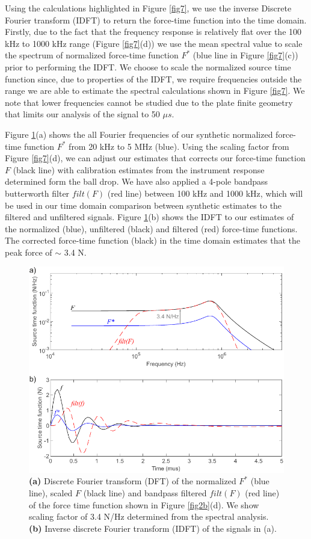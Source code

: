 \documentclass[preprint,3p, 11pt,authoryear]{elsarticle}
\begin{document}
Using the calculations highlighted in Figure \ref{fig7}, we use the inverse Discrete Fourier transform (IDFT) to return the force-time function into the time domain. Firstly, due to the fact that the frequency response is relatively flat over the 100 kHz to 1000 kHz range (Figure \ref{fig7}(d)) we use the mean spectral value to scale the spectrum of normalized force-time function $F^{*}$ (blue line in Figure \ref{fig7}(c)) prior to performing the IDFT. We choose to scale the normalized source time function since, due to properties of the IDFT, we require frequencies outside the range we are able to estimate the spectral calculations shown in Figure \ref{fig7}.  We note that lower frequencies cannot be studied due to the plate finite geometry that limits our analysis of the signal to 50 $\mu s$.  

Figure \ref{fig9}(a) shows the all Fourier frequencies of our synthetic normalized force-time function $F^{*}$ from 20 kHz to 5 MHz (blue). Using the scaling factor from Figure \ref{fig7}(d), we can adjust our estimates that corrects our force-time function $F$ (black line) with calibration estimates from the instrument response determined form the ball drop. We have also applied a 4-pole bandpass butterworth filter $filt(F)$ (red line) between 100 kHz and 1000 kHz, which will be used in our time domain comparison between synthetic estimates to the filtered and unfiltered signals. Figure \ref{fig9}(b) shows the IDFT to our estimates of the normalized (blue), unfiltered (black) and filtered (red) force-time functions.  The corrected force-time function (black) in the time domain estimates that the peak force of $\sim$ 3.4 N. 

\begin{figure}[ht]
     	\centering
\includegraphics[scale=0.9]{FIG9.pdf} 
\caption{\textbf{(a)} Discrete Fourier transform (DFT) of the normalized $F^{*}$ (blue line), scaled $F$ (black line) and bandpass filtered $filt(F)$ (red line) of the force time function shown in Figure \ref{fig2b}(d). We show scaling factor of 3.4 N/Hz determined from the spectral analysis. \textbf{(b)} Inverse discrete Fourier transform (IDFT) of the signals in (a). }
	\label{fig9} 
\end{figure}
\end{document}

